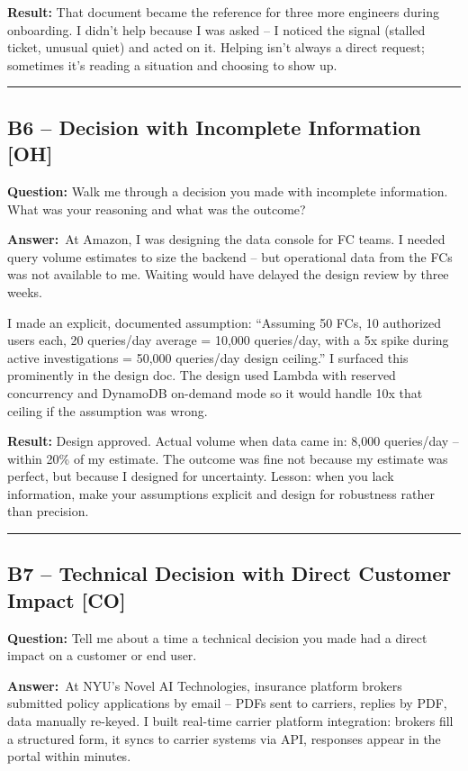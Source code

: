 \documentclass[letterpaper,10pt]{article}
\newlength{\boxwidth}
\newcommand{\bquestionbox}[1]{%
  \vspace{6pt}%
  \noindent\colorbox{bqbg}{%
    \begin{minipage}{\boxwidth}%
      \vspace{3pt}\textbf{\textcolor{orange!70!black}{Question:}} #1\vspace{3pt}%
    \end{minipage}%
  }\vspace{2pt}%
}
\newcommand{\answerlabel}{\noindent\textbf{\textcolor{answerblue}{Answer:}}~}
\begin{document}
\textbf{Result:} That document became the reference for three more engineers during onboarding. I didn't help because I was asked -- I noticed the signal (stalled ticket, unusual quiet) and acted on it. Helping isn't always a direct request; sometimes it's reading a situation and choosing to show up.

\rule{\linewidth}{0.2pt}

\subsection*{B6 -- Decision with Incomplete Information \textmd{[OH]}}

\bquestionbox{Walk me through a decision you made with incomplete information. What was your reasoning and what was the outcome?}

\answerlabel At Amazon, I was designing the data console for FC teams. I needed query volume estimates to size the backend -- but operational data from the FCs was not available to me. Waiting would have delayed the design review by three weeks.

I made an explicit, documented assumption: ``Assuming 50 FCs, 10 authorized users each, 20 queries/day average = 10,000 queries/day, with a 5x spike during active investigations = 50,000 queries/day design ceiling.'' I surfaced this prominently in the design doc. The design used Lambda with reserved concurrency and DynamoDB on-demand mode so it would handle 10x that ceiling if the assumption was wrong.

\textbf{Result:} Design approved. Actual volume when data came in: 8,000 queries/day -- within 20\% of my estimate. The outcome was fine not because my estimate was perfect, but because I designed for uncertainty. Lesson: when you lack information, make your assumptions explicit and design for robustness rather than precision.

\rule{\linewidth}{0.2pt}

\subsection*{B7 -- Technical Decision with Direct Customer Impact \textmd{[CO]}}

\bquestionbox{Tell me about a time a technical decision you made had a direct impact on a customer or end user.}

\answerlabel At NYU's Novel AI Technologies, insurance platform brokers submitted policy applications by email -- PDFs sent to carriers, replies by PDF, data manually re-keyed. I built real-time carrier platform integration: brokers fill a structured form, it syncs to carrier systems via API, responses appear in the portal within minutes.
\end{document}
